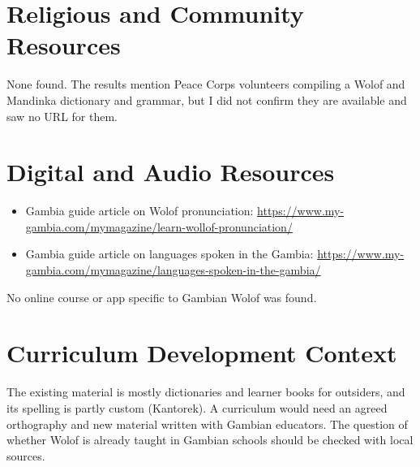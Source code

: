 \documentclass[12pt]{article}
\begin{document}
\section{Religious and Community Resources}
None found. The results mention Peace Corps volunteers compiling a Wolof and Mandinka dictionary and grammar, but I did not confirm they are available and saw no URL for them.

\section{Digital and Audio Resources}
\begin{itemize}
\item Gambia guide article on Wolof pronunciation: \url{https://www.my-gambia.com/mymagazine/learn-wollof-pronunciation/}
\item Gambia guide article on languages spoken in the Gambia: \url{https://www.my-gambia.com/mymagazine/languages-spoken-in-the-gambia/}
\end{itemize}
No online course or app specific to Gambian Wolof was found.

\section{Curriculum Development Context}
The existing material is mostly dictionaries and learner books for outsiders, and its spelling is partly custom (Kantorek). A curriculum would need an agreed orthography and new material written with Gambian educators. The question of whether Wolof is already taught in Gambian schools should be checked with local sources.
\end{document}
